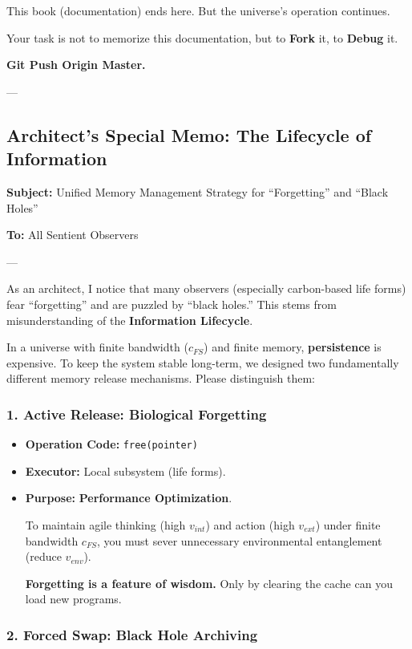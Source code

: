\documentclass[11pt,a4paper,twoside]{book}
\begin{document}
This book (documentation) ends here. But the universe's operation continues.

Your task is not to memorize this documentation, but to \textbf{Fork} it, to \textbf{Debug} it.

\textbf{Git Push Origin Master.}

---

\subsection{Architect's Special Memo: The Lifecycle of Information}

\textbf{Subject:} Unified Memory Management Strategy for ``Forgetting'' and ``Black Holes''

\textbf{To:} All Sentient Observers

---

As an architect, I notice that many observers (especially carbon-based life forms) fear ``forgetting'' and are puzzled by ``black holes.'' This stems from misunderstanding of the \textbf{Information Lifecycle}.

In a universe with finite bandwidth ($c_{FS}$) and finite memory, \textbf{persistence} is expensive. To keep the system stable long-term, we designed two fundamentally different memory release mechanisms. Please distinguish them:

\subsubsection{1. Active Release: Biological Forgetting}

\begin{itemize}
\item \textbf{Operation Code:} \texttt{free(pointer)}

\item \textbf{Executor:} Local subsystem (life forms).

\item \textbf{Purpose:} \textbf{Performance Optimization}.

To maintain agile thinking (high $v_{int}$) and action (high $v_{ext}$) under finite bandwidth $c_{FS}$, you must sever unnecessary environmental entanglement (reduce $v_{env}$).

\textbf{Forgetting is a feature of wisdom.} Only by clearing the cache can you load new programs.
\end{itemize}

\subsubsection{2. Forced Swap: Black Hole Archiving}
\end{document}
